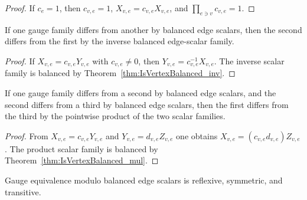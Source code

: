 \begin{proof}\leanok
    If $c_e=1$, then $c_{v,e}=1$, $X_{v,e}=c_{v,e}X_{v,e}$, and
    $\prod_{e\ni v}c_{v,e}=1$.
\end{proof}

\begin{theorem}%
    \label{thm:GaugeEquivModEdgeScalars_symm}
    \leanok
    If one gauge family differs from another by balanced edge scalars, then the
    second differs from the first by the inverse balanced edge-scalar family.
    \begin{center}
        \TNPEPSEdgeGaugeOrientation
    \end{center}
\end{theorem}

\begin{proof}\leanok
    If $X_{v,e}=c_{v,e}Y_{v,e}$ with $c_{v,e}\ne 0$, then
    $Y_{v,e}=c_{v,e}^{-1}X_{v,e}$. The inverse scalar family is balanced by
    Theorem~\ref{thm:IsVertexBalanced_inv}.
\end{proof}

\begin{theorem}%
    \label{thm:GaugeEquivModEdgeScalars_trans}
    \leanok
    If one gauge family differs from a second by balanced edge scalars, and the
    second differs from a third by balanced edge scalars, then the first differs
    from the third by the pointwise product of the two scalar families.
    \begin{center}
        \TNPEPSEdgeGaugeOrientation
    \end{center}
\end{theorem}

\begin{proof}\leanok
    From $X_{v,e}=c_{v,e}Y_{v,e}$ and $Y_{v,e}=d_{v,e}Z_{v,e}$ one obtains
    $X_{v,e}=(c_{v,e}d_{v,e})Z_{v,e}$. The product scalar family is balanced
    by Theorem~\ref{thm:IsVertexBalanced_mul}.
\end{proof}

\begin{theorem}%
    \label{thm:GaugeEquivModEdgeScalars_equivalence}
    \leanok
    Gauge equivalence modulo balanced edge scalars is reflexive, symmetric,
    and transitive.
\end{theorem}

